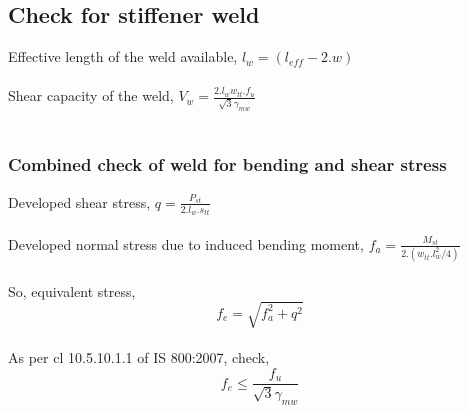 \documentclass[11.5pt,a4paper,oneside]{report}
\begin{document}
\begin{Form}
\subsection{Check for stiffener weld}
Effective length of the weld available, $l_w = (l_{eff} - 2.w)$\\
\\
Shear capacity of the weld, $V_w = \frac{2. l_w w_{tt} . f_u}{\sqrt{3} \gamma_{mw}}$\\
\\

\subsubsection{Combined check of weld for bending and shear stress}
Developed shear stress, $q = \frac{P_{st}}{2.l_w.s_{tt}}$\\
\\
Developed normal stress due to induced bending moment, $f_a = \frac{ M_{st}}{2.(w_{tt}.l_w^2/4)}$\\
\\
So, equivalent stress, 
\begin{equation}
	f_e = \sqrt{f_a^2 + q^2}
\end{equation}
\\
As per cl 10.5.10.1.1 of IS 800:2007, check, 
\begin{equation}
	f_e \leq \frac{f_u}{\sqrt{3} \gamma_{mw}}
\end{equation}


\end{Form}
\end{document}
